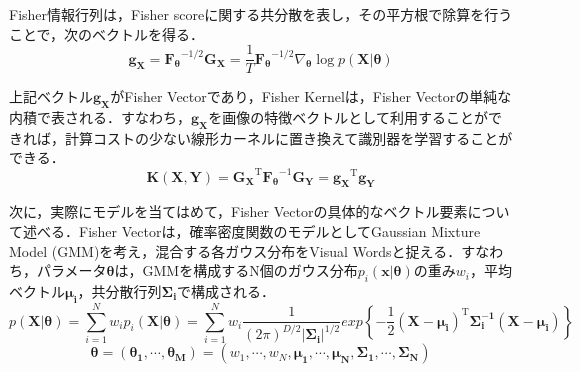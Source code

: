 Fisher情報行列は，Fisher scoreに関する共分散を表し，その平方根で除算を行うことで，次のベクトルを得る．
%
\begin{equation}
\label{eq:fisher_vector}
{
\bm{g}_{\bm{X}} 
= \bm{F_\theta}^{-1/2}\bm{G}_{\bm{X}} 
= \frac{1}{T} \bm{F_\theta}^{-1/2} \nabla_{\bm{\theta}} \log p(\bm{X}|\bm{\theta})
}
\end{equation}

上記ベクトル$ \bm{g}_{\bm{X}} $がFisher Vectorであり，Fisher Kernelは，Fisher Vectorの単純な内積で表される．すなわち，$ \bm{g}_{\bm{X}} $を画像の特徴ベクトルとして利用することができれば，計算コストの少ない線形カーネルに置き換えて識別器を学習することができる．
%
\begin{equation}
{
\bm{K}(\bm{X},\bm{Y}) 
= {{\bm{G}_{\bm{X}}}^{\mathrm{T}}}{\bm{F_\theta}^{-1}}{\bm{G}_{\bm{Y}}}
= {\bm{g}_{\bm{X}}}^{\mathrm{T}} \bm{g}_{\bm{Y}} 
}
\end{equation}

次に，実際にモデルを当てはめて，Fisher Vectorの具体的なベクトル要素について述べる．Fisher Vectorは，確率密度関数のモデルとしてGaussian Mixture Model (GMM)を考え，混合する各ガウス分布をVisual Wordsと捉える．すなわち，パラメータ$ \bm{\theta} $は，GMMを構成するN個のガウス分布$ p_i(\bm{x}|\bm{\theta}) $の重み$ w_i $，平均ベクトル$ \bm{\mu_i} $，共分散行列$ \bm{\Sigma_i} $で構成される．
%
\begin{equation}
\label{eq:gmm}
{
p(\bm{X}|\bm{\theta}) = \sum_{i=1}^{N} w_i p_i(\bm{X}|\bm{\theta}) 
= \sum_{i=1}^{N} w_i \frac{1}{ (2\pi)^{D/2}{\lvert{\bm{\Sigma_i}}\rvert}^{1/2} }{exp\left\{-\frac{1}{2}(\bm{X}-\bm{\mu_i})^{\mathrm{T}}\bm{\Sigma_i^{-1}}(\bm{X}-\bm{\mu_i})\right\}} 
}
\end{equation}
%
\begin{equation}
\label{eq:theta}
{
  \bm{\theta} = (\bm{\theta_1},\cdots,\bm{\theta_M}) 
  = (w_1,\cdots,w_N,\bm{\mu_1},\cdots,\bm{\mu_N},\bm{\Sigma_1},\cdots,\bm{\Sigma_N}) 
}
\end{equation}

